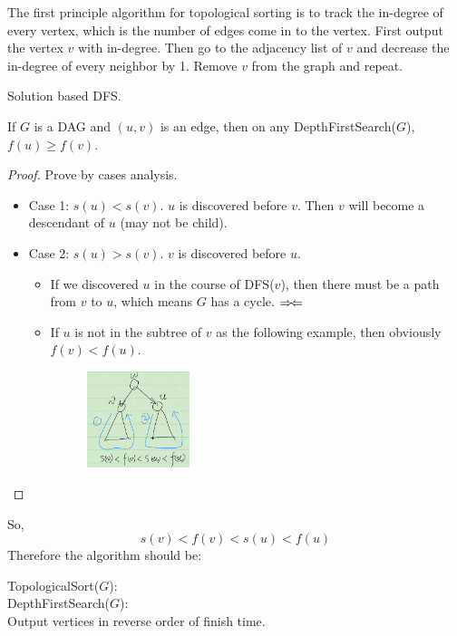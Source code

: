 \documentclass[en,hazy,blue,screen,14pt]{elegantnote}
\newcommand\tab[1][1cm]{\hspace*{#1}}
\begin{document}
The first principle algorithm for topological sorting is to track the in-degree 
of every vertex, which is the number of edges come in to the vertex. First 
output the vertex $v$ with in-degree. Then go to the adjacency list of $v$ and 
decrease the in-degree of every neighbor by 1. Remove $v$ from the graph and 
repeat.

Solution based DFS.
\begin{theorem}
 If $G$ is a DAG and $(u, v)$ is an edge, then on any DepthFirstSearch($G$), 
$f(u) \ge f(v)$.
\end{theorem}

\begin{proof}
Prove by cases analysis.
 \begin{itemize}
  \item Case 1: $s(u) < s(v)$. $u$ is discovered before $v$. Then $v$ will 
become a descendant of $u$ (may not be child).
  \item Case 2: $s(u) > s(v)$. $v$ is discovered before $u$. 
  \begin{itemize}
   \item If we discovered $u$ in the course of DFS($v$), then there must be 
a path from $v$ to $u$, which means $G$ has a cycle. 
$\Rightarrow\mskip-\thinmuskip\Leftarrow$
    \item If $u$ is not in the subtree of $v$ as the following example, 
then obviously $f(v) < f(u)$.
        \begin{figure}[H]
        \centering
        \includegraphics[width=0.3\textwidth]{dfs-s-f.png}
        \end{figure}
  \end{itemize}
 \end{itemize}
\end{proof}

So, \[s(v) < f(v) < s(u) < f(u)\]
Therefore the algorithm should be:

TopologicalSort($G$):\\
\tab\tab DepthFirstSearch($G$):\\
\tab\tab\tab\tab Output vertices in reverse order of finish time.
\end{document}
